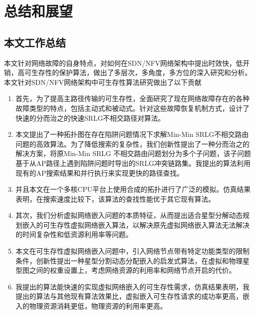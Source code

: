 
\chapter{总结和展望}
\section{本文工作总结}
本文针对网络故障的自身特点，对如何在SDN/NFV网络架构中提出时效快，低开销，高可生存性的保护算法，做出了多层次，多角度，多方位的深入研究和分析。本文针对SDN/NFV网络架构中可生存性算法研究做出了以下贡献
\begin{enumerate}
  \item 首先，为了提高主路径传输的可生存性，全面研究了现在网络故障存在的各种故障类型的特点，包括主动式和被动式。针对这些故障恢复机制方式，设计了快速的分而治之的快速SRLG不相交路径对算法。
  \item 本文提出了一种拓扑图在存在陷阱问题情况下求解Min-Min SRLG不相交路由问题的高效算法。为了降低搜索的复杂性，我们创新性提出了一种分而治之的解决方案，将原Min-Min SRLG 不相交路由问题划分为多个子问题，该子问题基于从AP路径上遇到陷阱问题时导出的SRLG冲突链路集。我提出的算法利用现有的AP搜索结果和并行执行来实现更快的路径查找。
  \item 并且本文在一个多核CPU平台上使用合成的拓扑进行了广泛的模拟。仿真结果表明，在搜索速度比较下，该算法的查找性能优于其它现有算法。
  \item 其次，我们分析虚拟网络嵌入问题的本质特征，从而提出适合星型分解动态规划嵌入的可生存性虚拟网络嵌入算法，以解决原先虚拟网络嵌入算法无法解决的时间复杂性和低资源利用率等问题。
  \item 本文在可生存性虚拟网络嵌入问题中，引入网络节点带有特定功能类型的限制条件，创新性提出一种星型分割动态分配嵌入的启发式算法，在虚拟和物理星型图之间的权重设置上，考虑网络资源的利用率和网络节点开启的代价。
  \item   我提出的算法能快速的实现虚拟网络嵌入的可生存性需求，仿真结果表明，我提出的算法与其他现有算法效果比，虚拟嵌入可生存性请求的成功率更高，嵌入的物理资源消耗更低，物理资源的利用率更高。
\end{enumerate}



